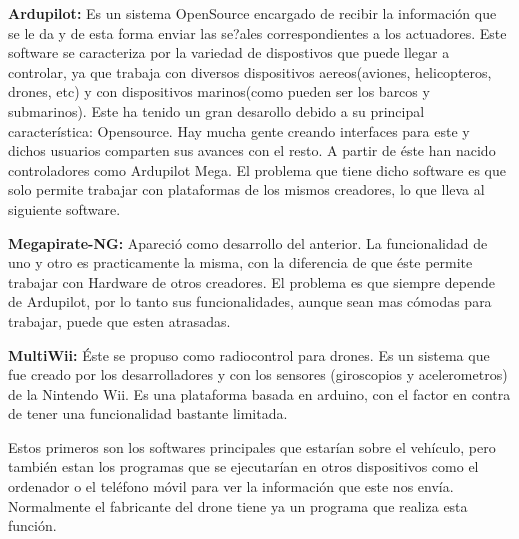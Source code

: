 \hspace{1 cm} \textbf{Ardupilot:} Es un sistema OpenSource encargado de recibir la informaci\'on que se le da y de esta forma enviar las se?ales correspondientes a los actuadores. Este software se caracteriza por la variedad de dispostivos que puede llegar a controlar, ya que trabaja con diversos dispositivos aereos(aviones, helicopteros, drones, etc) y con dispositivos marinos(como pueden ser los barcos y submarinos). Este ha tenido un gran desarollo debido a su principal caracter\'istica: Opensource. Hay mucha gente creando interfaces para este y dichos usuarios comparten sus avances con el resto. A partir de \'este han nacido controladores como Ardupilot Mega. El problema que tiene dicho software es que solo permite trabajar con plataformas de los mismos creadores, lo que lleva al siguiente software.

\hspace{1 cm} \textbf{Megapirate-NG:} Apareci\'o como desarrollo del anterior. La funcionalidad de uno y otro es practicamente la misma, con la diferencia de que \'este permite trabajar con Hardware de otros creadores. El problema es que siempre depende de Ardupilot, por lo tanto sus funcionalidades, aunque sean mas c\'omodas para trabajar, puede que esten atrasadas.

\hspace{1 cm} \textbf{MultiWii:} \'Este se propuso como radiocontrol para drones. Es un sistema que fue creado por los desarrolladores y con los sensores (giroscopios y acelerometros) de la Nintendo Wii. Es una plataforma basada en arduino, con el factor en contra de tener una funcionalidad bastante limitada. 

Estos primeros son los softwares principales que estar\'ian sobre el veh\'iculo, pero tambi\'en estan los programas que se ejecutar\'ian en otros dispositivos como el ordenador o el tel\'efono m\'ovil para ver la informaci\'on que este nos env\'ia. Normalmente el fabricante del drone tiene ya un programa que realiza esta funci\'on. 


